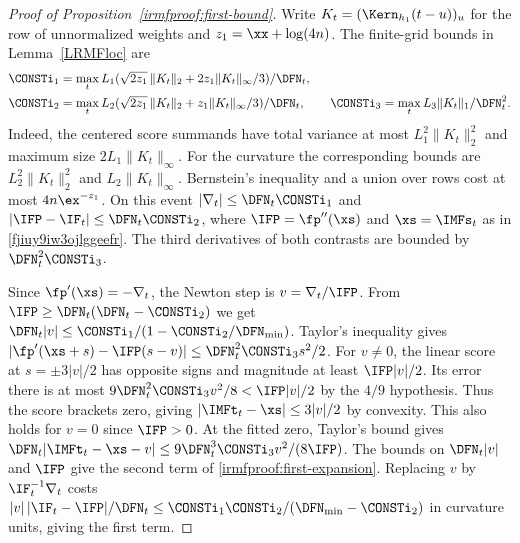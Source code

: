 \begin{proof}[Proof of Proposition~\ref{irmfproof:first-bound}]
Write \(K_t=(\Kern_{h_1}(t-u))_u\) for the row of unnormalized weights
and \(z_1=\xx+\log(4n)\). The finite-grid bounds in Lemma~\ref{LRMFloc} are
\begin{equation}\label{irmfproof:eq:first-calibration}
 \begin{aligned}
 \CONSTi_1&=\max_t L_1(\sqrt{2z_1}\,\|K_t\|_2+2z_1\|K_t\|_\infty/3)/\DFN_t,\\
 \CONSTi_2&=\max_t L_2(\sqrt{2z_1}\,\|K_t\|_2+z_1\|K_t\|_\infty/3)/\DFN_t,
 \qquad \CONSTi_3=\max_t L_3\|K_t\|_1/\DFN_t^2 .
 \end{aligned}
\end{equation}
Indeed, the centered score summands have total variance at most
\(L_1^2\|K_t\|_2^2\) and maximum size \(2L_1\|K_t\|_\infty\).
For the curvature the corresponding bounds are \(L_2^2\|K_t\|_2^2\) and
\(L_2\|K_t\|_\infty\). Bernstein's inequality and a union over rows cost
at most \(4n\ex^{-z_1}\). On this event \(|\nabla_t|\le\DFN_t\CONSTi_1\) and
\(|\IFP-\IF_t|\le\DFN_t\CONSTi_2\), where \(\IFP=\fp''(\xs)\) and
\(\xs=\IMFs_t\) as in \eqref{fjiuy9iw3ojlggeefr}. The third derivatives
of both contrasts are bounded by \(\DFN_t^2\CONSTi_3\).

Since \(\fp'(\xs)=-\nabla_t\), the Newton step is \(v=\nabla_t/\IFP\).
From \(\IFP\ge\DFN_t(\DFN_t-\CONSTi_2)\) we get
\(\DFN_t|v|\le\CONSTi_1/(1-\CONSTi_2/\DFN_{\min})\).
Taylor's inequality gives \(|\fp'(\xs+s)-\IFP(s-v)|\le\DFN_t^2\CONSTi_3 s^2/2\).
For \(v\ne0\), the linear score at \(s=\pm3|v|/2\) has opposite signs
and magnitude at least \(\IFP|v|/2\). Its error there is at most
\(9\DFN_t^2\CONSTi_3 v^2/8<\IFP|v|/2\) by the \(4/9\) hypothesis.
Thus the score brackets zero, giving \(|\IMFt_t-\xs|\le3|v|/2\) by convexity.
This also holds for \(v=0\) since \(\IFP>0\). At the fitted zero, Taylor's bound gives
\(\DFN_t|\IMFt_t-\xs-v|\le 9\DFN_t^3\CONSTi_3 v^2/(8\IFP)\).
The bounds on \(\DFN_t|v|\) and \(\IFP\) give the second term of \eqref{irmfproof:first-expansion}.
Replacing \(v\) by \(\IF_t^{-1}\nabla_t\) costs
\(|v|\,|\IF_t-\IFP|/\DFN_t\le\CONSTi_1\CONSTi_2/(\DFN_{\min}-\CONSTi_2)\)
in curvature units, giving the first term.
\end{proof}

